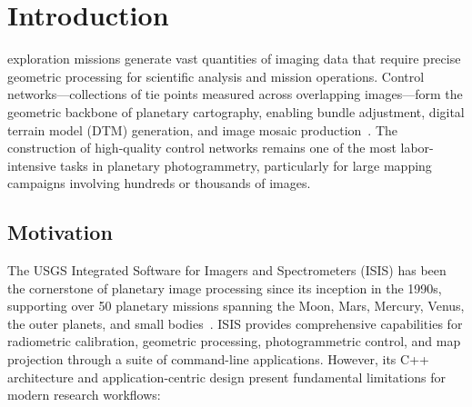 \documentclass[lettersize,journal]{IEEEtran}
\begin{document}

\section{Introduction}
 exploration missions generate vast quantities of imaging data that require precise geometric processing for scientific analysis and mission operations. Control networks---collections of tie points measured across overlapping images---form the geometric backbone of planetary cartography, enabling bundle adjustment, digital terrain model (DTM) generation, and image mosaic production~\cite{archinal2018iau,robinson2010lroc}. The construction of high-quality control networks remains one of the most labor-intensive tasks in planetary photogrammetry, particularly for large mapping campaigns involving hundreds or thousands of images.

\subsection{Motivation}

The USGS Integrated Software for Imagers and Spectrometers (ISIS) has been the cornerstone of planetary image processing since its inception in the 1990s, supporting over 50 planetary missions spanning the Moon, Mars, Mercury, Venus, the outer planets, and small bodies~\cite{usgs2024isis}. ISIS provides comprehensive capabilities for radiometric calibration, geometric processing, photogrammetric control, and map projection through a suite of command-line applications. However, its C++ architecture and application-centric design present fundamental limitations for modern research workflows:
\end{document}
